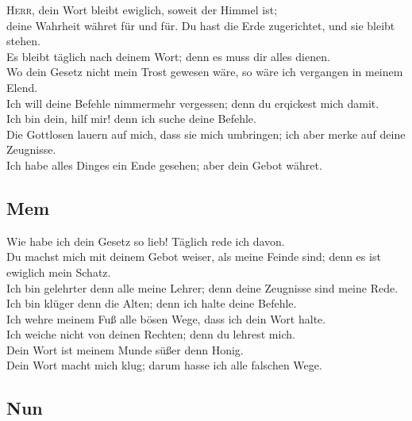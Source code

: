  \textsc{Herr}, dein Wort bleibt ewiglich, soweit der
Himmel ist;\\
 deine Wahrheit währet für und für. Du hast die Erde
zugerichtet, und sie bleibt stehen.\\
 Es bleibt täglich nach deinem Wort; denn es muss dir
alles dienen.\\
 Wo dein Gesetz nicht mein Trost gewesen wäre, so wäre
ich vergangen in meinem Elend.\\
 Ich will deine Befehle nimmermehr vergessen; denn du
erqickest mich damit.\\
 Ich bin dein, hilf mir! denn ich suche deine Befehle.\\
 Die Gottlosen lauern auf mich, dass sie mich umbringen;
ich aber merke auf deine Zeugnisse.\\
 Ich habe alles Dinges ein Ende gesehen; aber dein Gebot
währet.

\hypertarget{mem}{%
\subsection{Mem}\label{mem}}

 Wie habe ich dein Gesetz so lieb! Täglich rede ich
davon.\\
 Du machst mich mit deinem Gebot weiser, als meine Feinde
sind; denn es ist ewiglich mein Schatz.\\
 Ich bin gelehrter denn alle meine Lehrer; denn deine
Zeugnisse sind meine Rede.\\
 Ich bin klüger denn die Alten; denn ich halte deine
Befehle.\\
 Ich wehre meinem Fuß alle bösen Wege, dass ich dein
Wort halte.\\
 Ich weiche nicht von deinen Rechten; denn du lehrest
mich.\\
 Dein Wort ist meinem Munde süßer denn Honig.\\
 Dein Wort macht mich klug; darum hasse ich alle
falschen Wege.

\hypertarget{nun}{%
\subsection{Nun}\label{nun}}

